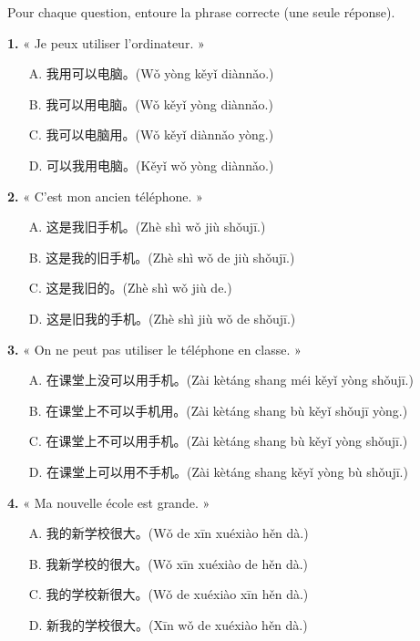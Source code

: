 \documentclass[11pt]{article}
\begin{document}
\begin{exercice}
Pour chaque question, entoure la phrase correcte (une seule réponse).

\textbf{1.} « Je peux utiliser l'ordinateur. »
\begin{itemize}
\item[A.] 我用可以电脑。(Wǒ yòng kěyǐ diànnǎo.)
\item[B.] 我可以用电脑。(Wǒ kěyǐ yòng diànnǎo.)
\item[C.] 我可以电脑用。(Wǒ kěyǐ diànnǎo yòng.)
\item[D.] 可以我用电脑。(Kěyǐ wǒ yòng diànnǎo.)
\end{itemize}

\textbf{2.} « C'est mon ancien téléphone. »
\begin{itemize}
\item[A.] 这是我旧手机。(Zhè shì wǒ jiù shǒujī.)
\item[B.] 这是我的旧手机。(Zhè shì wǒ de jiù shǒujī.)
\item[C.] 这是我旧的。(Zhè shì wǒ jiù de.)
\item[D.] 这是旧我的手机。(Zhè shì jiù wǒ de shǒujī.)
\end{itemize}

\textbf{3.} « On ne peut pas utiliser le téléphone en classe. »
\begin{itemize}
\item[A.] 在课堂上没可以用手机。(Zài kètáng shang méi kěyǐ yòng shǒujī.)
\item[B.] 在课堂上不可以手机用。(Zài kètáng shang bù kěyǐ shǒujī yòng.)
\item[C.] 在课堂上不可以用手机。(Zài kètáng shang bù kěyǐ yòng shǒujī.)
\item[D.] 在课堂上可以用不手机。(Zài kètáng shang kěyǐ yòng bù shǒujī.)
\end{itemize}

\textbf{4.} « Ma nouvelle école est grande. »
\begin{itemize}
\item[A.] 我的新学校很大。(Wǒ de xīn xuéxiào hěn dà.)
\item[B.] 我新学校的很大。(Wǒ xīn xuéxiào de hěn dà.)
\item[C.] 我的学校新很大。(Wǒ de xuéxiào xīn hěn dà.)
\item[D.] 新我的学校很大。(Xīn wǒ de xuéxiào hěn dà.)
\end{itemize}
\end{exercice}
\end{document}

